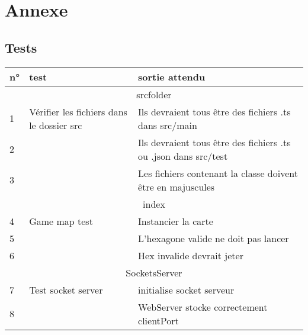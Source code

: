 \section{Annexe}

\subsection{Tests}
\newpage

\begin{center}
    \begin{tabular}{|l|l|l|}
        \hline

        n° & test                                      & sortie attendu                                                    \\ \hline
        \multicolumn{3}{|c|}{srcfolder}                                                                                    \\
        \hline
        1  & Vérifier les fichiers dans le dossier src & Ils devraient tous être des fichiers .ts dans src/main            \\
        2  &                                           & Ils devraient tous être des fichiers .ts  ou  .json dans src/test \\
        3  &                                           & Les fichiers contenant la classe doivent être en majuscules       \\
        \hline
        \multicolumn{3}{|c|}{index}                                                                                        \\
        \hline
        4  & Game map test                             & Instancier la carte                                               \\
        5  &                                           & L'hexagone valide ne doit pas lancer                              \\
        6  &                                           & Hex invalide devrait jeter                                        \\
        \hline
        \multicolumn{3}{|c|}{SocketsServer}                                                                                \\
        \hline
        7  & Test socket server                        & initialise socket serveur                                         \\
        8  &                                           & WebServer stocke correctement clientPort                          \\

\end{tabular}
\end{center}
